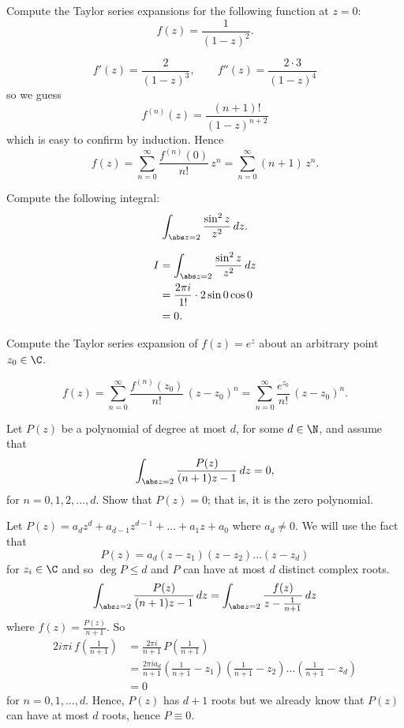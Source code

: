
\question Compute the Taylor series expansions for the following function at $z = 0$:
\[
    f(z) = \frac{1}{(1-z)^2}. 
\]
\begin{solution}
    \[
        f'(z) = \frac{2}{(1-z)^3}, \qquad f''(z) = \frac{2 \cdot 3}{(1-z)^4} 
    \]
    so we guess
    \[
        f^{(n)}(z) = \frac{(n+1)!}{(1-z)^{n+2}}
    \]
    which is easy to confirm by induction.
    Hence
    \[
        f(z) 
        = \sum^{\infty}_{n=0} \frac{f^{(n)}(0)}{n!} \, z^n
        = \sum^{\infty}_{n=0} (n+1) \, z^n.
    \]
\end{solution}

\question Compute the following integral:
\[
    \int_{\abs z = 2} \frac{\sin^2z}{z^2} \,dz.
\]
\begin{solution}
    \begin{align*}
        I
        &= \int_{\abs z = 2} \frac{\sin^2z}{z^2} \,dz \\
        &= \frac{2 \pi i}{1!} \cdot 2\sin 0 \cos 0 \\
        &= 0.
    \end{align*}
\end{solution}

\question Compute the Taylor series expansion of $f(z) = e^z$ about an arbitrary point $z_0 \in \C$.
\begin{solution}
    \[
        f(z)
        = \sum^{\infty}_{n=0} \frac{f^{(n)}(z_0)}{n!} \, (z-z_0)^n
        = \sum^{\infty}_{n=0} \frac{e^{z_0}}{n!} \, (z-z_0)^n.
    \]
\end{solution}

\question Let $P(z)$ be a polynomial of degree at most $d$, for some $d \in \N$, and assume that
\[
    \int_{\abs z = 2} \frac{P(z)}{(n+1)z - 1} \,dz = 0,
\]
for $n = 0,1,2,\ldots,d$. 
Show that $P(z) = 0$; that is, it is the zero polynomial.
\begin{solution}
    Let $P(z) = a_dz^d + a_{d-1}z^{d-1} + \ldots + a_1z + a_0$ where $a_d \neq 0$.
    We will use the fact that
    \[
        P(z) = a_d(z-z_1)(z-z_2)\ldots(z-z_d)
    \]  
    for $z_i \in \C$ and so $\deg P \leq d$ and $P$ can have at most
    $d$ distinct complex roots.
    \[
        \int_{\abs z = 2} \frac{P(z)}{(n+1)z - 1} \,dz 
        = \int_{\abs z = 2} \frac{f(z)}{z - \frac1{n+1}} \,dz 
    \]
    where $f(z) = \frac{P(z)}{n+1}$.
    So
    \begin{align*}
        2i \pi i \, f\left(\frac1{n+1}\right) 
        &= \frac{2\pi i}{n+1} \, P\left(\frac1{n+1}\right) \\
        &= \frac{2 \pi i a_d}{n + 1}
            \left(
                \frac{1}{n+1} - z_1
            \right)
            \left(
                \frac{1}{n+1} - z_2
            \right)
            \ldots
            \left(
                \frac{1}{n+1} - z_d
            \right) \\
        &= 0
    \end{align*}
    for $n=0,1,\ldots,d$.
    Hence, $P(z)$ has $d+1$ roots but we already know that $P(z)$ can have at most $d$ roots,
    hence $P \equiv 0$.
\end{solution}

